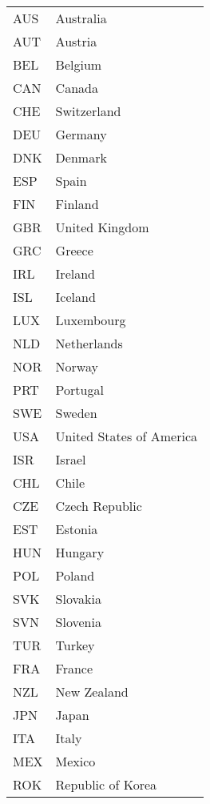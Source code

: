 \begin{tabular}{l l }\tabularnewline
AUS	&	Australia       	\tabularnewline
AUT	&	Austria 	\tabularnewline
BEL	&	Belgium 	\tabularnewline
CAN	&	Canada  	\tabularnewline
CHE	&	Switzerland     	\tabularnewline
DEU	&	Germany 	\tabularnewline
DNK	&	Denmark         	\tabularnewline
ESP	&	Spain   	\tabularnewline
FIN	&	Finland 	\tabularnewline
GBR	&	United Kingdom  	\tabularnewline
GRC	&	Greece  	\tabularnewline
IRL	&	Ireland 	\tabularnewline
ISL	&	Iceland 	\tabularnewline
LUX	&	Luxembourg      	\tabularnewline
NLD	&	Netherlands     	\tabularnewline
NOR	&	Norway  	\tabularnewline
PRT	&	Portugal        	\tabularnewline
SWE	&	Sweden  	\tabularnewline
USA	&	United States of America  	\tabularnewline
ISR	&	Israel  	\tabularnewline
CHL	&	Chile   	\tabularnewline
CZE	&	Czech Republic  	\tabularnewline
EST	&	Estonia 	\tabularnewline
HUN	&	Hungary 	\tabularnewline
POL	&	Poland  	\tabularnewline
SVK	&	Slovakia        	\tabularnewline
SVN	&	Slovenia        	\tabularnewline
TUR	&	Turkey  	\tabularnewline
FRA	&	France  	\tabularnewline
NZL	&	New Zealand     	\tabularnewline
JPN	&	Japan   	\tabularnewline
ITA	&	Italy   	\tabularnewline
MEX	&	Mexico  	\tabularnewline
ROK	&	Republic of Korea       	\tabularnewline
\end{tabular}